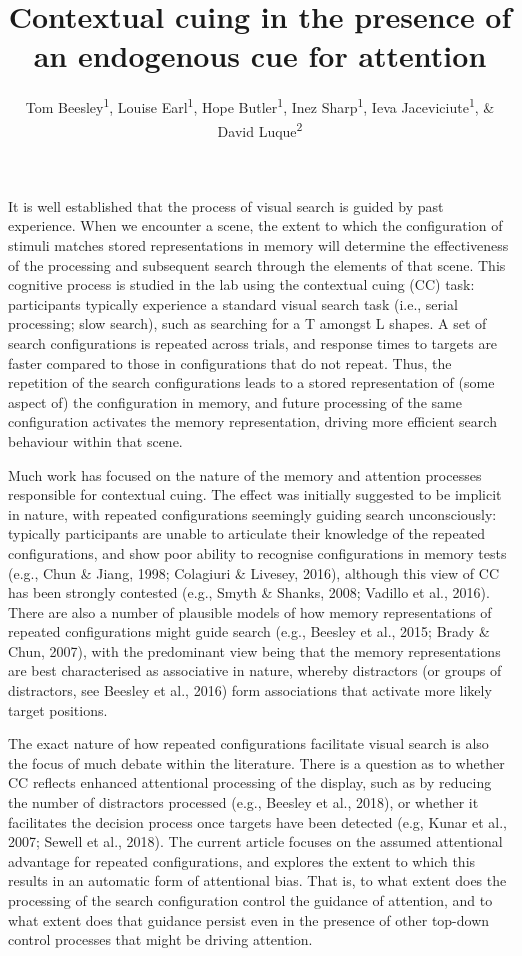 \documentclass[
  man,floatsintext]{apa7}
\title{Contextual cuing in the presence of an endogenous cue for attention}
\author{Tom Beesley\textsuperscript{1}, Louise Earl\textsuperscript{1}, Hope Butler\textsuperscript{1}, Inez Sharp\textsuperscript{1}, Ieva Jaceviciute\textsuperscript{1}, \& David Luque\textsuperscript{2}}
\date{}
\affiliation{\vspace{0.5cm}\textsuperscript{1} Lancaster University, UK\\\textsuperscript{2} Universidad de Málaga, Spain}
\begin{document}
\maketitle

It is well established that the process of visual search is guided by past experience. When we encounter a scene, the extent to which the configuration of stimuli matches stored representations in memory will determine the effectiveness of the processing and subsequent search through the elements of that scene. This cognitive process is studied in the lab using the contextual cuing (CC) task: participants typically experience a standard visual search task (i.e., serial processing; slow search), such as searching for a T amongst L shapes. A set of search configurations is repeated across trials, and response times to targets are faster compared to those in configurations that do not repeat. Thus, the repetition of the search configurations leads to a stored representation of (some aspect of) the configuration in memory, and future processing of the same configuration activates the memory representation, driving more efficient search behaviour within that scene.

Much work has focused on the nature of the memory and attention processes responsible for contextual cuing. The effect was initially suggested to be implicit in nature, with repeated configurations seemingly guiding search unconsciously: typically participants are unable to articulate their knowledge of the repeated configurations, and show poor ability to recognise configurations in memory tests (e.g., Chun \& Jiang, 1998; Colagiuri \& Livesey, 2016), although this view of CC has been strongly contested (e.g., Smyth \& Shanks, 2008; Vadillo et al., 2016). There are also a number of plausible models of how memory representations of repeated configurations might guide search (e.g., Beesley et al., 2015; Brady \& Chun, 2007), with the predominant view being that the memory representations are best characterised as associative in nature, whereby distractors (or groups of distractors, see Beesley et al., 2016) form associations that activate more likely target positions.

The exact nature of how repeated configurations facilitate visual search is also the focus of much debate within the literature. There is a question as to whether CC reflects enhanced attentional processing of the display, such as by reducing the number of distractors processed (e.g., Beesley et al., 2018), or whether it facilitates the decision process once targets have been detected (e.g, Kunar et al., 2007; Sewell et al., 2018). The current article focuses on the assumed attentional advantage for repeated configurations, and explores the extent to which this results in an automatic form of attentional bias. That is, to what extent does the processing of the search configuration control the guidance of attention, and to what extent does that guidance persist even in the presence of other top-down control processes that might be driving attention.
\end{document}
